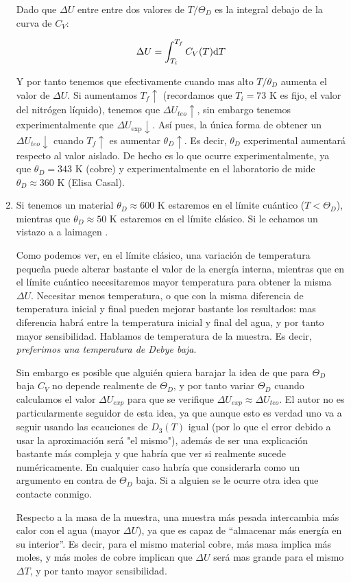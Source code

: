 \begin{enumerate}[label=\alph*)]
Dado que $\Delta U$ entre entre dos valores de $T/\Theta_D$ es la integral debajo de la curva de $C_V$:

\[
\Delta U = \int_{T_i}^{T_f} C_V(T) \mathrm{d} T
\]

Y por tanto tenemos que efectivamente cuando mas alto $T/\theta_D$ aumenta el valor de $\Delta U$. Si aumentamos $T_f \uparrow$ (recordamos que $T_i=73$ K es fijo, el valor del nitrógen líquido), tenemos que $\Delta U_{teo} \uparrow$, sin embargo tenemos experimentalmente que $\Delta U_{\exp} \downarrow$. Así pues, la única forma de obtener un $\Delta U_{teo} \downarrow$ cuando $T_f \uparrow$ es aumentar $\theta_D \uparrow$. Es decir, $\theta_D$ experimental aumentará respecto al valor aislado. De hecho es lo que ocurre experimentalmente, ya que $\theta_D=343$ K (cobre) y experimentalmente en el laboratorio de mide $\theta_D \approx 360$ K (Elisa Casal). 

\item Si tenemos un material $\theta_D\approx 600$ K estaremos en el límite cuántico ($T<\Theta_D$), mientras que $\theta_D \approx 50$ K estaremos en el límite clásico. Si le echamos un vistazo a a laimagen .

Como podemos ver, en el límite clásico, una variación de temperatura pequeña puede alterar bastante el valor de la energía interna, mientras que en el límite cuántico necesitaremos mayor temperatura para obtener la misma $\Delta U$. Necesitar menos temperatura, o que con la misma diferencia de temperatura inicial y final pueden mejorar bastante los resultados: mas diferencia habrá entre la temperatura inicial y final del agua, y por tanto mayor sensibilidad. Hablamos de temperatura de la muestra. Es decir, \textit{preferimos una temperatura de Debye baja}. 

Sin embargo es posible que alguién quiera barajar la idea de que para $\Theta_D$ baja $C_V$ no depende realmente de $\Theta_D$, y por tanto variar $\Theta_D$ cuando calculamos el valor $\Delta U_{exp}$ para que se verifique $\Delta U_{exp}\approx \Delta U_{teo}$. El autor no es particularmente seguidor de esta idea, ya que aunque esto es verdad uno va a seguir usando las ecauciones de $D_3(T)$ igual (por lo que el error debido a usar la aproximación será "el mismo"), además de ser una explicación bastante más compleja y que habría que ver si realmente sucede numéricamente. En cualquier caso habría que considerarla como un argumento en contra de $\Theta_D$ baja. Si a alguien se le ocurre otra idea que contacte conmigo. 


Respecto a la masa de la muestra, una muestra más pesada intercambia más calor con el agua (mayor $\Delta U$), ya que es capaz de ``almacenar más energía en su interior''. Es decir, para el mismo material cobre, más masa implica más moles, y más moles de cobre implican que $\Delta U$ será mas grande para el mismo $\Delta T$, y por tanto mayor sensibilidad. 
\end{enumerate}

